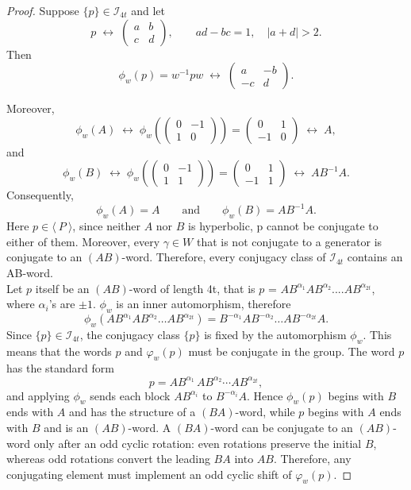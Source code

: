 \documentclass[10pt,a4paper]{amsart}
\begin{document}
\begin{proof}
Suppose $\{p\}\in \mathscr I_{4t}$ and let
$$
p \;\longleftrightarrow\;
\begin{pmatrix}
a & b\\
c & d
\end{pmatrix},
\qquad ad-bc=1,\quad |a+d|>2.
$$
Then
$$
\phi_w(p)=w^{-1}pw
\;\longleftrightarrow\;
\begin{pmatrix}
a & -b\\
-c & d
\end{pmatrix}.
$$

Moreover,
$$
\phi_w(A)
\;\longleftrightarrow\;
\phi_w\!\left(
\begin{pmatrix}
0 & -1\\
1 & 0
\end{pmatrix}\right)
=
\begin{pmatrix}
0 & 1\\
-1 & 0
\end{pmatrix}
\;\longleftrightarrow\; A,
$$
and
$$
\phi_w(B)
\;\longleftrightarrow\;
\phi_w\!\left(
\begin{pmatrix}
0 & -1\\
1 & 1
\end{pmatrix}\right)
=
\begin{pmatrix}
0 & 1\\
-1 & 1
\end{pmatrix}
\;\longleftrightarrow\; AB^{-1}A.
$$
Consequently,
$$
\phi_w(A)=A
\qquad\text{and}\qquad
\phi_w(B)=AB^{-1}A.
$$
Here $p \in\langle~ P ~\rangle$, since neither $A$ nor $B$ is hyperbolic, p cannot be conjugate to either of them. Moreover, every $\gamma \in W$ that is not conjugate to a generator is conjugate to an $(AB)$-word. Therefore, every conjugacy class of $\mathscr{I}_{4t}$ contains an AB-word.\\ Let $p$ itself be an $(AB)$-word of length 4t, that is $p$ = $AB^{\alpha_1}AB^{\alpha_2}....AB^{\alpha_{2t}}$, where $\alpha_i$'s are $\pm1$. $\phi_w$ is an inner automorphism, therefore $$\phi_w(AB^{\alpha_1}AB^{\alpha_2}\dots AB^{\alpha_{2t}}) = B^{-\alpha_1}AB^{-\alpha_2}\dots AB^{-\alpha_{2t}}A.$$
 Since $\{p\}\in \mathscr{I}_{4t}$, the conjugacy class $\{p\}$ is fixed by the automorphism 
$\phi_{w}$. This means that the words $p$ and $\varphi_{w}(p)$ must be conjugate in the 
group. The word $p$ has the standard form
\[
p = AB^{\alpha_1}\, AB^{\alpha_2}\cdots AB^{\alpha_{2t}},
\]
and applying $\phi_{w}$ sends each block $AB^{\alpha_i}$ to $B^{-\alpha_i}A$. Hence 
$\phi_{w}(p)$ begins with $B$ ends with $A$ and has the structure of a $(BA)$-word, while $p$ begins 
with $A$ ends with $B$ and is an $(AB)$-word. A $(BA)$-word can be conjugate to an $(AB)$-word only after 
an odd cyclic rotation: even rotations preserve the initial $B$, whereas odd rotations 
convert the leading $BA$ into $AB$. Therefore, any conjugating element must implement an odd 
cyclic shift of $\varphi_{w}(p)$.


\end{proof}
\end{document}
